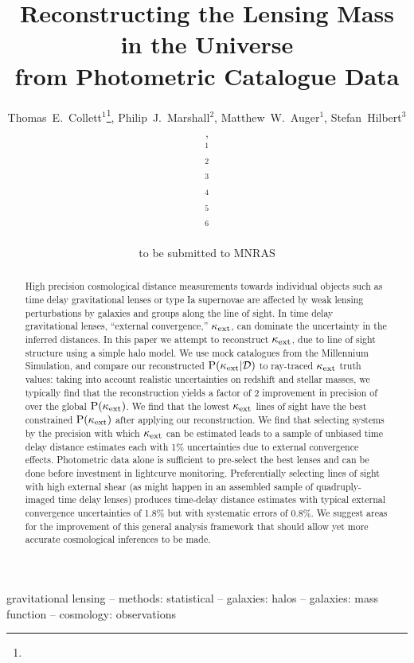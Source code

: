 \documentclass[useAMS,usenatbib]{mn2e}
\title[Line of Sight Mass Reconstruction]
{Reconstructing the Lensing Mass in the Universe \\
from Photometric Catalogue Data}
\author[Collett \etal]{%
  Thomas~E.~Collett$^{1}$\thanks{\collettemail},
  Philip~J.~Marshall$^{2}$,
  Matthew~W.~Auger$^{1}$,
  Stefan~Hilbert$^{3}$,
\newauthor{%
  Sherry~H.~Suyu$^{4}$,
  Zachary~Greene$^{4}$,
  Tommaso~Treu$^{4}$\thanks{\packard},}
\newauthor{%
  Christopher~D.~Fassnacht$^{5}$,
  L\'eon~V.~E.~Koopmans$^{6}$,
  Roger~D.~Blandford$^{3}$} 
  \medskip\\
  $^1$\ioa\\
  $^2$\oxford\\
  $^3$\kipac\\
  $^4$\ucsb\\
  $^5$\davis\\
  $^6$\kapteyn
}
\begin{document}
             
\date{to be submitted to MNRAS}
\pagerange{\pageref{firstpage}--\pageref{lastpage}}

\maketitle           

\label{firstpage}


\begin{abstract} 

High precision cosmological distance measurements towards individual objects
such as time delay gravitational lenses or type Ia supernovae are affected by
weak lensing perturbations by galaxies and groups along the line of sight.
In time delay gravitational lenses,
``external convergence,'' $\kappa_{\rm ext}$, can dominate the uncertainty in the inferred distances.
In this paper we attempt to reconstruct $\kappa_{\rm ext}$,
due to line of sight structure using a simple halo model.
 We use mock catalogues from the Millennium Simulation, and compare
our reconstructed ${\rm P}(\kappa_{\rm ext}|{\mathcal{D}})$ to ray-traced $\kappa_{\rm ext}$ truth values: 
taking into account realistic uncertainties on redshift and stellar masses, we
typically find that the reconstruction yields a factor of 2 improvement in precision of
over the global ${\rm P}(\kappa_{\rm ext})$. We find that the lowest $\kappa_{\rm ext}$ lines of sight have the best constrained 
${\rm P}(\kappa_{\rm ext})$ after applying our reconstruction. We find that selecting systems by the precision with which
$\kappa_{\rm ext}$ can be estimated leads to a sample of unbiased
time delay distance estimates each with 1\% uncertainties due to external convergence effects.
Photometric data alone is sufficient to pre-select the best lenses and can be done
before investment in lightcurve monitoring. Preferentially selecting lines of
sight with high external shear (as might happen in an assembled sample of
quadruply-imaged time delay lenses) produces time-delay distance estimates with
typical external convergence uncertainties of 1.8\% but with systematic errors of 0.8\%.
We suggest areas for the improvement of this general analysis framework that
should allow yet more accurate cosmological inferences to be made.
\end{abstract}


\begin{keywords}
  gravitational lensing   --
  methods: statistical    --
  galaxies: halos         --
  galaxies: mass function  --
  cosmology: observations
\end{keywords}
\end{document}

